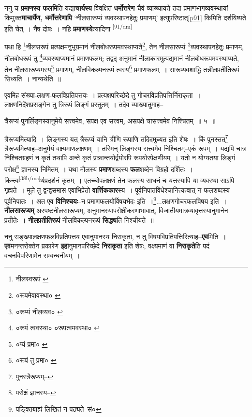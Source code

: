\documentclass[article,12pt,a4paper]{memoir}
\begin{document}
	  \pstart ननु च \textbf{प्रमाणस्य फलमि}ति यद्या\textbf{चार्यस्य} विवक्षितं \textbf{धर्मोत्तरेण} चैवं व्याख्यायते तदा प्रमाणभागव्यवस्थायां किमुक्त\textbf{माचार्येण, धर्मोत्तरेणापि} ‘नीलसारूप्यं व्यवस्थापनहेतुः प्रमाणम्’ इत्युपरिष्टात्\cref{p91} किमिति दर्शयिष्यते इति चेत् । नैष दोषः । नहि \textbf{प्रमाणस्ये}त्यादिना  \leavevmode\textsuperscript{\rmlatinfont\tiny [91/dm]} 
	  
	यथा हि \footnote{नीलस्वरूपं \cite{dp-msC} \cite{dp-msD}}नीलसरूपं प्रत्यक्षमनुभूयमानं नीलबोधरूपमवस्थाप्यते\footnote{०रूपमेवावस्था० \cite{dp-msC}}, तेन नीलसारूप्यं \footnote{०रूप्यं नीलव्यव० \cite{dp-msC}}व्यवस्थापनहेतुः प्रमाणम्, नीलबोधरूपं तु \footnote{०रूपं त्ववस्था० \cite{dp-msD} ०रूपत्वमवस्था० \cite{dp-msC}}व्यवस्थाप्यमानं प्रमाणफलम्; तद्वद् अनुमानं नीलाकारमुत्पद्यमानं नीलबोधरूपमवस्थाप्यते, तेन नीलसारूप्यमस्य\footnote{०प्यं प्रमा० \cite{dp-msC}} प्रमाणम्, नीलविकल्पनरूपं त्वस्य\footnote{०रूपं तु प्रमा० \cite{dp-msB} \cite{dp-msD}} प्रमाणफलम् । सारूप्यवशाद्धि तन्नीलप्रतीतिरूपं सिध्यति । नान्यथेति ॥ 
	  
	एवमिह संख्या-लक्षण-फलविप्रतिपत्तयः । प्रत्यक्षपरिच्छेदे तु गोचरविप्रतिपत्तिर्निराकृता । लक्षणनिर्देशप्रसङ्गेन तु त्रिरूपं लिङ्गं प्रस्तुतम् । तदेव व्याख्यातुमाह-- 
	  
	त्रैरूप्यं पुनर्लिङ्गस्यानुमेये सत्त्वमेव, सपक्ष एव सत्त्वम्, असपक्षे चासत्त्वमेव निश्चितम् ॥ ५ ॥ 
	  
	त्रैरूप्यमित्यादि । लिङ्गस्य यत् त्रैरूप्यं यानि त्रीणि रूपाणि तदिदमुच्यत इति शेषः । किं पुनस्तत्\footnote{पुनस्त्रैरूप्यम्--\cite{dp-msA}} त्रैरूप्यमित्याह--अनुमेयं वक्ष्यमाणलक्षणम् । तस्मिन् लिङ्गस्य सत्त्वमेव निश्चितम्--एकं रूपम् । यद्यपि चात्र निश्चितग्रहणं न कृतं तथापि अन्ते कृतं प्रक्रान्तयोर्द्वयोरपि रूपयोरपेक्षणीयम् । यतो न योग्यतया लिङ्गं परोक्ष\footnote{परोक्षं ज्ञानस्य--\cite{dp-msC}} ज्ञानस्य निमितम् । यथा मौलस्य \textbf{प्रमाण}शब्दस्य \textbf{फल}शब्देन विग्रहो दर्शितः । किन्त्व\leavevmode\textsuperscript{\rmlatinfont\tiny [38b/ms]}र्थप्रदर्शनं कृतम् । एतच्चोपलक्षणं तेन फलस्य साधनं च यत्तस्यापि या व्यवस्था साऽपि गृह्यते । मूले तु द्वन्द्वसमास एवाभिप्रेतो \textbf{वार्त्तिककार}स्य । पूर्वनिपातविधेश्चानित्यत्वात् न फलशब्दस्य पूर्वनिपातः । अत एव \textbf{विनिश्चयः}--न प्रमाणफलयोर्विषयभेदः इति ।\footnote{पङ्क्तिबाह्यं लिखितं न पठ्यते--सं०}...लक्षणगोचरफलविषय इति । \textbf{नीलसारूप्यम्} अस्पष्टनीलसारूप्यम्, अनुमानस्यापरोक्षीकरणाभावात्, विजातीयमात्रव्यावृत्तस्यानुमानेन प्रतीतेः । \textbf{नीलप्रतीतिरूपं} नीलविकल्पनरूपं \textbf{सिद्ध्य}ति निश्चीयते ॥
	\pend
      

	  \pstart ननु सङ्ख्यालक्षणफलविप्रतिपत्तय एवानुमानस्य निराकृता, न तु विषयविप्रतिपत्तिरित्याह--\textbf{एव}मिति । \textbf{एव}मनन्तरोक्तेन प्रकारेण \textbf{इहा}नुमानपरिच्छेदे \textbf{निराकृता} इति शेषः, वक्ष्यमाणं वा \textbf{निराकृते}ति पदं वचनविपरिणामेन सम्बन्धनीयम् ।
	\pend
      
\end{document}
